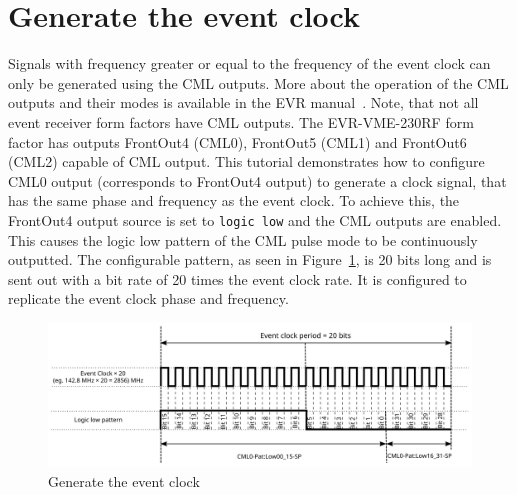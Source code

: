 \documentclass[12pt,a4paper]{article}
\begin{document}
\section{Generate the event clock}\label{sec:generate_event_clock}
Signals with frequency greater or equal to the frequency of the event clock can only be generated using the CML outputs. More about the operation of the CML outputs and their modes is available in the EVR manual~\cite{evr_manual}. Note, that not all event receiver form factors have CML outputs. The EVR-VME-230RF form factor has outputs FrontOut4 (CML0), FrontOut5 (CML1) and FrontOut6 (CML2) capable of CML output. This tutorial demonstrates how to configure CML0 output (corresponds to FrontOut4 output) to generate a clock signal, that has the same phase and frequency as the event clock. To achieve this, the FrontOut4 output source is set to \texttt{logic low} and the CML outputs are enabled. This causes the logic low pattern of the CML pulse mode to be continuously outputted. The configurable pattern, as seen in Figure~\ref{fig:gen_evt_clk}, is 20 bits long and is sent out with a bit rate of 20 times the event clock rate. It is configured to replicate the event clock phase and frequency.

\begin{figure}[H]
	\centering
	\includegraphics[width=\columnwidth]{./img/gen_evt_clk}
	\caption{Generate the event clock}
	\label{fig:gen_evt_clk}
\end{figure}
\end{document}
